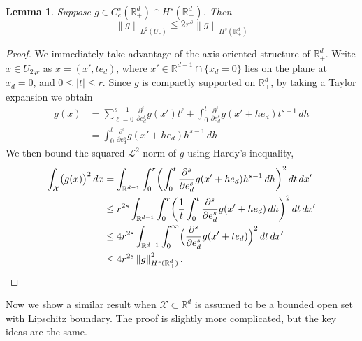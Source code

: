 \documentclass{article}
\newcommand{\Reals}{\mathbb{R}}
\newcommand{\abs}[1]{\left \lvert #1 \right \rvert}
\newcommand{\norm}[1]{\left \lVert #1 \right \rVert}
\newcommand{\1}{\mathbf{1}}
\newcommand{\Rd}{\Reals^d}
\newcommand{\Rdp}{\Reals_+^d}
\newcommand{\Xset}{\mathcal{X}}
\newcommand{\Leb}{\mathcal{L}}
\theoremstyle{alden}
\theoremstyle{aldenthm}
\newtheorem{lemma}{Lemma}
\theoremstyle{definition}
\theoremstyle{remark}
\begin{document}
\begin{lemma}
	Suppose $g \in C_c^{s}(\Rdp) \cap H^s(\Rdp)$. Then
	\begin{equation}
	\norm{g}_{L^2(U_{r})} \leq 2 r^s\norm{g}_{H^s(\Rdp)}
	\end{equation}  
\end{lemma}
\begin{proof}
	We immediately take advantage of the axis-oriented structure of $\Rdp$. Write $x \in U_{2qr}$ as $x = (x',te_d)$, where $x' \in \Reals^{d - 1} \cap \{x_d = 0\}$ lies on the plane at $x_d = 0$, and $0 \leq \abs{t} \leq r$. Since $g$ is compactly supported on $\Rdp$, by taking a Taylor expansion we obtain
	\begin{align*}
	g(x) & = \sum_{\ell = 0}^{s - 1} \frac{\partial^\ell}{\partial e_d^\ell}g(x') t^{\ell} + \int_{0}^{t} \frac{\partial^s}{\partial e_d^s} g(x' + he_d) t^{s - 1} \,dh \\
	& = \int_{0}^{t} \frac{\partial^s}{\partial e_d^s} g(x' + he_d) h^{s - 1} \,dh
	\end{align*}
	We then bound the squared $\Leb^2$ norm of $g$ using Hardy's inequality,
	\begin{align*}
	\int_{\Xset} \bigl(g(x)\bigr)^2 \,dx & = \int_{\Reals^{d - 1}} \int_{0}^{r} \biggl(\int_{0}^{t} \frac{\partial^s}{\partial e_d^s} g(x' + he_d) h^{s - 1} \,dh\biggr)^2 \,dt \,dx' \\
	& \leq r^{2s} \int_{\Reals^{d - 1}} \int_{0}^{r} \biggl(\frac{1}{t}\int_{0}^{t} \frac{\partial^s}{\partial e_d^s} g(x' + he_d) \,dh\biggr)^2 \,dt \,dx' \\
	& \leq 4 r^{2s} \int_{\Reals^{d - 1}} \int_{0}^{\infty} \Bigl(\frac{\partial^s}{\partial e_d^s} g(x' + te_d)\Bigr)^2  \,dt \,dx' \\
	& \leq 4 r^{2s} \norm{g}_{H^s(\Rdp)}^2.
	\end{align*}
\end{proof}

Now we show a similar result when $\Xset \subset \Rd$ is assumed to be a bounded open set with Lipschitz boundary. The proof is slightly more complicated, but the key ideas are the same.
\end{document}

